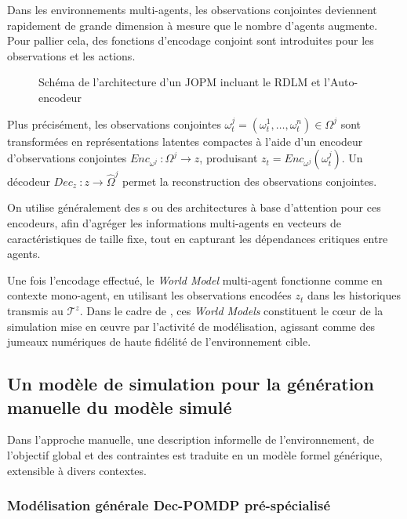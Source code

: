 Dans les environnements multi-agents, les observations conjointes deviennent rapidement de grande dimension à mesure que le nombre d'agents augmente. Pour pallier cela, des fonctions d'encodage conjoint sont introduites pour les observations et les actions.

\begin{figure}[h]
    \centering
    \resizebox{\textwidth}{!}{%
        
    }
    \caption{Schéma de l'architecture d'un JOPM incluant le RDLM et l'Auto-encodeur}
    \label{fig:jopm_architecture}
\end{figure}


Plus précisément, les observations conjointes $\omega_t^{j} = (\omega_t^1, \dots, \omega_t^n) \in \Omega^{j}$ sont transformées en représentations latentes compactes à l'aide d'un encodeur d'observations conjointes $Enc_{\omega^j}~: \Omega^j \rightarrow z$, produisant $z_t = Enc_{\omega^j}(\omega_t^j)$. Un décodeur $Dec_z~: z \rightarrow \hat{\Omega}^j$ permet la reconstruction des observations conjointes.

On utilise généralement des s ou des architectures à base d'attention pour ces encodeurs, afin d'agréger les informations multi-agents en vecteurs de caractéristiques de taille fixe, tout en capturant les dépendances critiques entre agents.

Une fois l'encodage effectué, le \textit{World Model} multi-agent fonctionne comme en contexte mono-agent, en utilisant les observations encodées $z_t$ dans les historiques transmis au  $\mathcal{T}^{z}$. Dans le cadre de , ces \textit{World Models} constituent le cœur de la simulation mise en œuvre par l'activité de modélisation, agissant comme des jumeaux numériques de haute fidélité de l'environnement cible.

\subsection{Un modèle de simulation pour la génération manuelle du modèle simulé}

Dans l’approche manuelle, une description informelle de l’environnement, de l’objectif global et des contraintes est traduite en un modèle formel générique, extensible à divers contextes.

\subsubsection{Modélisation générale Dec-POMDP pré-spécialisé}

